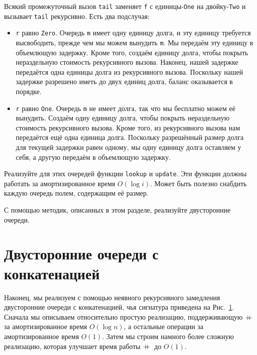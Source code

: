 \begin{theorem}
  Всякий промежуточный вызов \lstinline!tail! заменяет \lstinline!f! с
  единицы-\lstinline!One! на двойку-\lstinline!Two! и вызывает
  \lstinline!tail! рекурсивно. Есть два подслучая:
  \begin{itemize}
  \item \lstinline!r! равно \lstinline!Zero!. Очередь \lstinline!m! имеет одну
    единицу долга, и эту единицу требуется высвободить, прежде чем мы можем
    вынудить \lstinline!m!. Мы передаём эту единицу в объемлющую
    задержку. Кроме того, создаём единицу долга, чтобы покрыть
    нераздельную стоимость рекурсивного вызова.  Наконец, нашей
    задержке передаётся одна единицы долга из рекурсивного вызова.
    Поскольку нашей задержке разрешено иметь до двух единиц долга,
    баланс оказывается в порядке.
  \item \lstinline!r! равно \lstinline!One!. Очередь \lstinline!m! не
    имеет долга, так что мы бесплатно можем её вынудить. Создаём одну
    единицу долга, чтобы покрыть нераздельную стоимость рекурсивного
    вызова. Кроме того, из рекурсивного вызова нам передаётся ещё одна
    единица долга. Поскольку разрешённый размер долга для текущей
    задержки равен одному, мы одну единицу долга оставляем у себя, а
    другую передаём в объемлющую задержку.
  \end{itemize}
\end{theorem}

\begin{exercise}\label{ex:11.1}
  Реализуйте для этих очередей функции \lstinline!lookup! и
  \lstinline!update!. Эти функции должны работать за амортизированное
  время $O(\log i)$. Может быть полезно снабдить каждую очередь
  полем, содержащим её размер.
\end{exercise}

\begin{exercise}\label{ex:11.2}
  С помощью методик, описанных в этом разделе, реализуйте двусторонние
  очереди.
\end{exercise}

\section{Двусторонние очереди с конкатенацией}
\label{sc:11.2}

Наконец, мы реализуем с помощью неявного рекурсивного замедления
двусторонние очереди с конкатенацией, чья сигнатура приведена на
Рис.~\ref{sc:11.2}. Сначала мы описываем относительно простую
реализацию, поддерживающую $+\!\!\!+\,$ за амортизированное время $O(\log
n)$, а остальные операции за амортизированное время $O(1)$. Затем мы
строим намного более сложную реализацию, которая улучшает время работы
$+\!\!\!+\,$ до $O(1)$.


